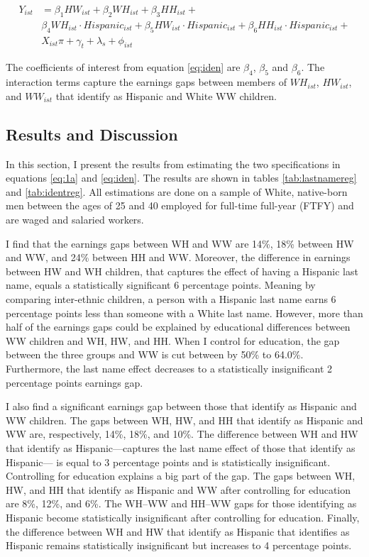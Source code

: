 \documentclass[12pt, fullpage]{article}
\begin{document}
\begin{align} \label{eq:iden}
Y_{ist} &= \beta_{1} HW_{ist} +  \beta_{2} WH_{ist} + \beta_{3} HH_{ist} +\\
& \beta_{4} WH_{ist} \cdot Hispanic_{ist} + \beta_{5} HW_{ist}\cdot Hispanic_{ist} +  \beta_{6} HH_{ist} \cdot Hispanic_{ist}+ \nonumber \\
&X_{ist} \pi + \gamma_{t} + \lambda_s + \phi_{ist} \nonumber
\end{align}

The coefficients of interest from equation \ref{eq:iden} are $\beta_{4}$, $\beta_{5}$ and $\beta_{6}$. The interaction terms capture the earnings gaps between members of $WH_{ist}$, $HW_{ist}$, and $WW_{ist}$ that identify as Hispanic and White WW children. 

\subsection{Results and Discussion}\label{sec:results1}

In this section, I present the results from estimating the two specifications in equations \ref{eq:1a} and \ref{eq:iden}. The results are shown in tables \ref{tab:lastnamereg} and \ref{tab:identreg}. All estimations are done on a sample of White, native-born men between the ages of 25 and 40 employed for full-time full-year (FTFY) and are waged and salaried workers.

I find that the earnings gaps between WH and WW are 14\%, 18\% between HW and WW, and 24\% between HH and WW. Moreover, the difference in earnings between HW and WH children, that captures the effect of having a Hispanic last name, equals a statistically significant 6 percentage points. Meaning by comparing inter-ethnic children, a person with a Hispanic last name earns 6 percentage points less than someone with a White last name. However, more than half of the earnings gaps could be explained by educational differences between WW children and WH, HW, and HH. When I control for education, the gap between the three groups and WW is cut between by 50\% to 64.0\%. Furthermore, the last name effect decreases to a statistically insignificant 2 percentage points earnings gap.

I also find a significant earnings gap between those that identify as Hispanic and WW children. The gaps between WH, HW, and HH that identify as Hispanic and WW are, respectively, 14\%, 18\%, and 10\%. The difference between WH and HW that identify as Hispanic---captures the last name effect of those that identify as Hispanic--- is equal to 3 percentage points and is statistically insignificant. Controlling for education explains a big part of the gap. The gaps between WH, HW, and HH that identify as Hispanic and WW after controlling for education are 8\%, 12\%, and 6\%. The WH--WW and HH--WW gaps for those identifying as Hispanic become statistically insignificant after controlling for education. Finally, the difference between WH and HW that identify as Hispanic that identifies as Hispanic remains statistically insignificant but increases to 4 percentage points.
\end{document}
